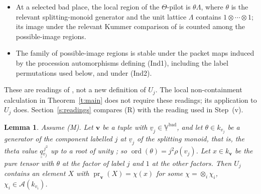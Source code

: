 \documentclass[11pt]{amsart}
\newtheorem{lemma}[theorem]{Lemma}
\theoremstyle{remark}
\newcommand{\cA}{\mathcal A}
\newcommand{\qq}{\underline{\underline{q}}{}}
\newcommand{\Vbad}{\underline{\mathbb V}^{\mathrm{bad}}}
\newcommand{\pr}{\operatorname{pr}}
\newcommand{\bv}{\mathbf v}
\begin{document}
\begin{itemize}
\item[\textup{(M)}] At a selected bad place, the local region of the $\Theta$-pilot is
$\theta\Lambda$, where $\theta$ is the relevant splitting-monoid generator and the unit
lattice $\Lambda$ contains $1\otimes\cdots\otimes1$; its image under the relevant Kummer
comparison of \cite[Thm.~3.11(ii)]{IUT3} is counted among the possible-image regions.
\item[\textup{(R)}] The family of possible-image regions is stable under the packet
maps induced by the procession automorphisms defining (Ind1), including the label
permutations used below, and under (Ind2).
\end{itemize}
These are readings of \cite[Prop.~3.7(v), Def.~3.8(i), Thm.~3.11, Cor.~3.12]{IUT3},
not a new definition of $U_j$. The local non-containment calculation in
Theorem~\ref{t:main} does not require these readings; its application to $U_j$ does.
Section~\ref{s:readings} compares \textup{(R)} with the reading used in Step~(v).

\begin{lemma}\label{l:member}
Assume \textup{(M)}. Let $\bv$ be a tuple with $\underline v_j\in\Vbad$, and let $\theta\in k_{v_j}$ be a generator of the component
labelled $j$ at $\underline v_j$ of the splitting monoid, that is, the theta value $\qq_{v_j}^{\,j^2}$ up to a root
of unity \cite[p.~11]{IUT3}; so $\operatorname{ord}(\theta)=j^2\rho(v_j)$. Let $x\in k_{\bv}$ be the pure tensor
with $\theta$ at the factor of label $j$ and $1$ at the other factors. Then $U_j$ contains an element $X$ with
$\pr_{\bv}(X)=\chi(x)$ for some $\chi=\otimes_i\chi_i$, $\chi_i\in\cA(k_{v_i})$.
\end{lemma}
\end{document}
